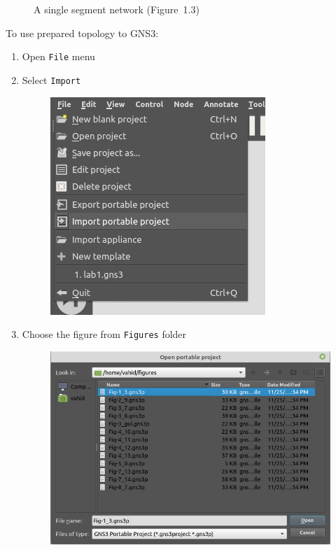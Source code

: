 \documentclass{../UTNetLab}
\begin{document}
\begin{center}
\begin{minipage}{0.48\textwidth}
\begin{flushright}
\begin{figure}[H]
                \caption{A single segment network (Figure~1.3)}
            \end{figure}
        \end{flushright}
    \end{minipage}
\end{center}

To use prepared topology to GNS3:
\begin{enumerate}
    \item Open \texttt{File} menu
    \item Select \texttt{Import }
        \begin{figure}[H]
            \centering
            \includegraphics[scale=0.5]{img/1}
        \end{figure}
    \item Choose the figure from \texttt{Figures} folder
        \begin{figure}[H]
            \centering
            \includegraphics[scale=0.7]{img/2}

\end{figure}
\end{enumerate}
\end{document}
